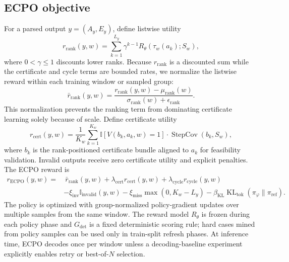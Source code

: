 \documentclass{article}
\newcommand{\Gdet}{G_{\mathrm{det}}}
\begin{document}
\subsection{ECPO objective}
For a parsed output $y=(A_y,E_y)$, define listwise utility
\begin{equation}
r_{\mathrm{rank}}(y,w)=
\sum_{k=1}^{L_y}\gamma^{k-1} R_\theta(\tau_w(a_k);S_w),
\end{equation}
where $0<\gamma\le 1$ discounts lower ranks. Because $r_{\mathrm{rank}}$ is a discounted sum while the certificate and cycle terms are bounded rates, we normalize the listwise reward within each training window or sampled group:
\begin{equation}
\bar r_{\mathrm{rank}}(y,w)=
\frac{r_{\mathrm{rank}}(y,w)-\mu_{\mathrm{rank}}(w)}{\sigma_{\mathrm{rank}}(w)+\epsilon_{\mathrm{rank}}}.
\end{equation}
This normalization prevents the ranking term from dominating certificate learning solely because of scale.
Define certificate utility
\begin{equation}
r_{\mathrm{cert}}(y,w)=
\frac{1}{K_w}\sum_{k=1}^{K_w}
\mathbb{I}[V(b_k,a_k,w)=1]\cdot
\operatorname{StepCov}(b_k,S_w),
\end{equation}
where $b_k$ is the rank-positioned certificate bundle aligned to $a_k$ for feasibility validation. Invalid outputs receive zero certificate utility and explicit penalties. The ECPO reward is
\begin{equation}
\begin{aligned}
r_{\mathrm{ECPO}}(y,w)=&\ \bar r_{\mathrm{rank}}(y,w)
+\lambda_{\mathrm{cert}} r_{\mathrm{cert}}(y,w)
+\lambda_{\mathrm{cycle}} r_{\mathrm{cycle}}(y,w)\\
&-\xi_{\mathrm{inv}}\mathbb{I}_{\mathrm{invalid}}(y,w)
-\xi_{\mathrm{miss}}\max(0,K_w-L_y)
-\beta_{\mathrm{KL}}\operatorname{KL}_{\mathrm{tok}}(\pi_\varphi\|\pi_{\mathrm{ref}}).
\end{aligned}
\end{equation}
The policy is optimized with group-normalized policy-gradient updates over multiple samples from the same window. The reward model $R_\theta$ is frozen during each policy phase and $\Gdet$ is a fixed deterministic scoring rule; hard cases mined from policy samples can be used only in train-split refresh phases. At inference time, ECPO decodes once per window unless a decoding-baseline experiment explicitly enables retry or best-of-$N$ selection.
\end{document}
